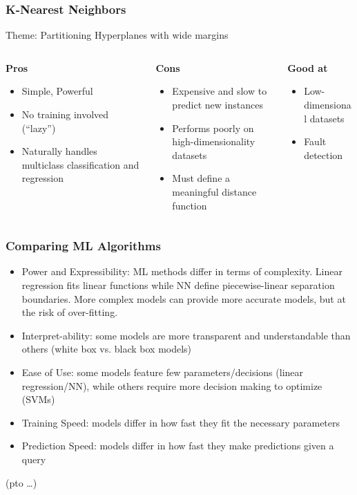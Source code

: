 \begin{frame}\frametitle{K-Nearest Neighbors}
Theme: Partitioning Hyperplanes with wide margins

   \begin{columns}[t]
    \begin{column}{0.3\linewidth}
	\textbf{Pros}
		\begin{itemize}
		\item   Simple, Powerful
		\item  No training involved (``lazy'')
		\item Naturally handles multiclass classification
and regression
		\end{itemize}
    \end{column}
    \begin{column}{0.3\linewidth}
	\textbf{Cons}
			\begin{itemize}
		\item   Expensive and slow to predict new instances
		\item  Performs poorly on high-dimensionality datasets
		\item   Must define a meaningful distance function
		\end{itemize}
    \end{column}
	
    \begin{column}{0.3\linewidth}
	\textbf{Good at}
			\begin{itemize}
		\item  Low-dimensional datasets
		\item  Fault detection 
		\end{itemize}
    \end{column}
	
  \end{columns}
\end{frame}



\begin{frame}[fragile]\frametitle{Comparing ML Algorithms}
\begin{itemize}
\item  Power and Expressibility: ML methods differ in terms
of complexity. Linear regression fits linear functions while NN define piecewise-linear separation boundaries. More complex models can provide more accurate models, but
at the risk of over-fitting.
\item  Interpret-ability: some models are more transparent
and understandable than others (white box vs. black box
models)
\item  Ease of Use: some models feature few parameters/decisions (linear regression/NN), while others
require more decision making to optimize (SVMs)
\item  Training Speed: models differ in how fast they fit the
necessary parameters
\item  Prediction Speed: models differ in how fast they make
predictions given a query
\end{itemize}
(pto \ldots)
\end{frame}


